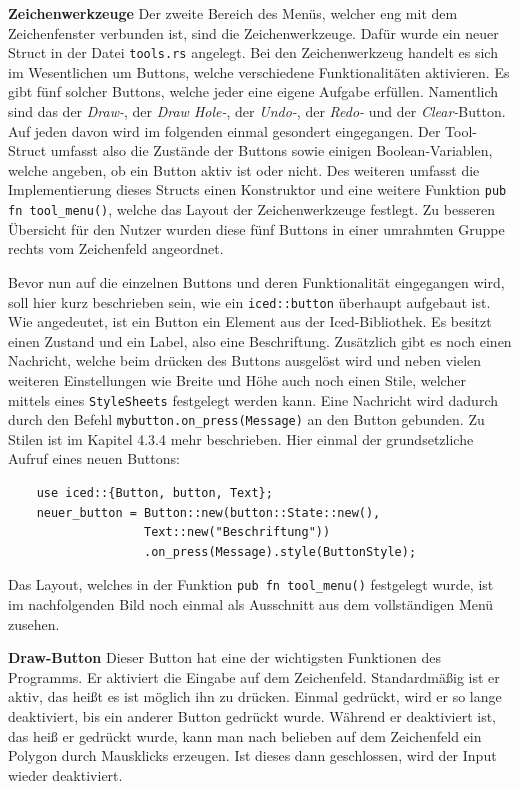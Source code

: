 \textbf{Zeichenwerkzeuge}\linebreak
Der zweite Bereich des Menüs, welcher eng mit dem Zeichenfenster verbunden ist, sind die Zeichenwerkzeuge. Dafür wurde ein neuer Struct in der Datei \lstinline{tools.rs} angelegt.  Bei den Zeichenwerkzeug handelt es sich im Wesentlichen um Buttons, welche verschiedene Funktionalitäten aktivieren.
Es gibt fünf solcher Buttons, welche jeder eine eigene Aufgabe erfüllen. Namentlich sind das der \emph{Draw-}, der \emph{Draw Hole-}, der \emph{Undo-}, der \emph{Redo-} und der \emph{Clear-}Button. Auf jeden davon wird im folgenden einmal gesondert eingegangen.
Der Tool-Struct umfasst also die Zustände der Buttons sowie einigen Boolean-Variablen, welche angeben, ob ein Button aktiv ist oder nicht. Des weiteren umfasst die Implementierung dieses Structs einen Konstruktor und eine weitere Funktion \lstinline{pub fn tool_menu()}, welche das Layout der Zeichenwerkzeuge festlegt.
Zu besseren Übersicht für den Nutzer wurden diese fünf Buttons in einer umrahmten Gruppe rechts vom Zeichenfeld angeordnet.

Bevor nun auf die einzelnen Buttons und deren Funktionalität eingegangen wird, soll hier kurz beschrieben sein, wie ein \lstinline{iced::button} überhaupt aufgebaut ist. 
Wie angedeutet, ist ein Button ein Element aus der Iced-Bibliothek. Es besitzt einen Zustand und ein Label, also eine Beschriftung. Zusätzlich gibt es noch einen Nachricht, welche beim drücken des Buttons ausgelöst wird und neben vielen weiteren Einstellungen wie Breite und Höhe auch noch einen 
Stile, welcher mittels eines \lstinline{StyleSheets} festgelegt werden kann. Eine Nachricht wird dadurch durch den Befehl \lstinline{mybutton.on_press(Message)} an den Button gebunden. 
Zu Stilen ist im Kapitel 4.3.4 mehr beschrieben. Hier einmal der grundsetzliche Aufruf eines neuen Buttons:


\begin{lstlisting}
    use iced::{Button, button, Text};
    neuer_button = Button::new(button::State::new(), 
                   Text::new("Beschriftung"))
                   .on_press(Message).style(ButtonStyle);
\end{lstlisting}

Das Layout, welches in der Funktion \lstinline{pub fn tool_menu()} festgelegt wurde, ist im nachfolgenden Bild noch einmal als Ausschnitt aus dem vollständigen Menü zusehen.
\linebreak

\textbf{\small{Draw-Button}}\linebreak
Dieser Button hat eine der wichtigsten Funktionen des Programms. Er aktiviert die Eingabe auf dem Zeichenfeld. Standardmäßig ist er aktiv, das heißt es ist möglich ihn zu drücken. Einmal gedrückt, wird er so lange 
deaktiviert, bis ein anderer Button gedrückt wurde. Während er deaktiviert ist, das heiß er gedrückt wurde, kann man nach belieben auf dem Zeichenfeld ein Polygon durch Mausklicks erzeugen. Ist dieses dann geschlossen, wird der 
Input wieder deaktiviert.\linebreak

